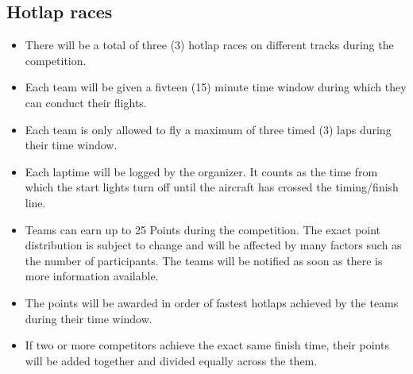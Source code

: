     \subsection{Hotlap races}
    \begin{itemize}
      \item There will be a total of three (3) hotlap races on different tracks during the competition. 
      \item Each team will be given a fivteen (15) minute time window during which they can conduct their flights. 
      \item Each team is only allowed to fly a maximum of three timed (3) laps during their time window. 
      \item Each laptime will be logged by the organizer. It counts as the time from which the start lights turn off until the aircraft has crossed the timing/finish line. 
      \item Teams can earn up to 25 Points during the competition. The exact point distribution is subject to change and will be affected by many factors such as the number of participants.
      The teams will be notified as soon as there is more information available.
      \item The points will be awarded in order of fastest hotlaps achieved by the teams during their time window.
      \item If two or more competitors achieve the exact same finish time, their points will be added together and divided equally across the them.  
    \end{itemize}

  




